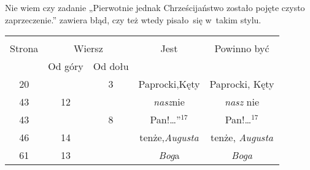 \documentclass[a4paper,11pt]{article}
\numberwithin{equation}{section}
\begin{document}

\vspace{0em}



\vspace{0em}


\noindent
{} Nie wiem czy zadanie „Pierwotnie jednak
Chrześcijaństwo zostało pojęte czysto zaprzeczenie.” zawiera błąd,
czy też wtedy pisało~się w~takim stylu.

\VerSpaceFour










\newpage



\begin{center}

  \begin{tabular}{|c|c|c|c|c|}
    \hline
    & \multicolumn{2}{c|}{} & & \\
    Strona & \multicolumn{2}{c|}{Wiersz} & Jest
                              & Powinno być \\ \cline{2-3}
    & Od góry & Od dołu & & \\
    \hline
    20  & &  3 & Paprocki,Kęty & Paprocki, Kęty \\
    43  & 12 & & \textit{nasz}nie & \textit{nasz} nie \\
    43  & &  8 & Pan!\ldots”$^{ 17 }$ & Pan!\ldots$^{ 17 }$ \\
    46  & 14 & & tenże,\textit{Augusta} & tenże, \textit{Augusta} \\
    61  & 13 & & \textit{Bog}a & \textit{Boga} \\
    \hline
  \end{tabular}

\end{center}
\end{document}
